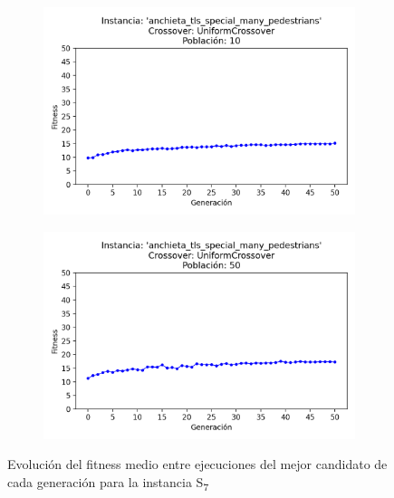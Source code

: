 \begin{figure}[h]
\begin{subfigure}[t]{.49\textwidth}
      \includegraphics[width=\textwidth]{report/images/estudio/anchieta_tls_special_many_pedestrians-UniformCrossover-10.png}
    \end{subfigure}
    \hfill
    \begin{subfigure}[t]{.49\textwidth}
      \centering
      \includegraphics[width=\textwidth]{report/images/estudio/anchieta_tls_special_many_pedestrians-UniformCrossover-50.png}
    \end{subfigure}
    \caption{Evolución del fitness medio entre ejecuciones del mejor candidato de cada generación para la instancia S\textsubscript{7}}
    \label{fig:estudio:anchieta_tls_special_many_pedestrians}
\end{figure}

